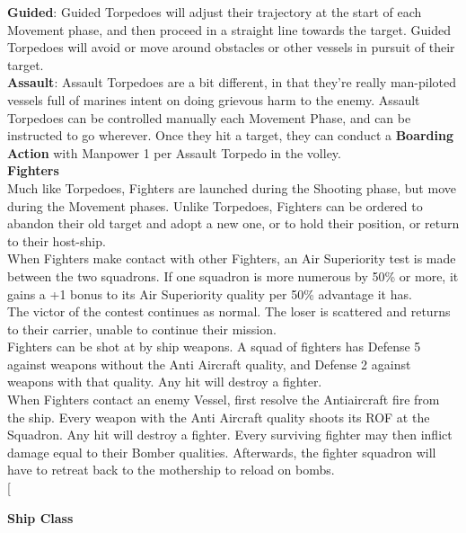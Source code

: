 \documentclass[a4paper, twocolumn, openany]{book}
\begin{document}
{{\bfseries Guided}: Guided Torpedoes will adjust their trajectory at the start of each Movement phase, and
then proceed in a straight line towards the target. Guided Torpedoes will avoid or move around
obstacles or other vessels in pursuit of their target.\\

{\bfseries Assault}: Assault Torpedoes are a bit different, in that they’re really man-piloted vessels full of
marines intent on doing grievous harm to the enemy. Assault Torpedoes can be controlled
manually each Movement Phase, and can be instructed to go wherever. Once they hit a target,
they can conduct a {\bfseries Boarding Action} with Manpower 1 per Assault Torpedo in the volley.\\

{\bfseries Fighters\\}
Much like Torpedoes, Fighters are launched during the Shooting phase, but move during the
Movement phases. Unlike Torpedoes, Fighters can be ordered to abandon their old target and
adopt a new one, or to hold their position, or return to their host-ship.\\

When Fighters make contact with other Fighters, an Air Superiority test is made between the
two squadrons. If one squadron is more numerous by 50\% or more, it gains a +1 bonus to its Air
Superiority quality per 50\% advantage it has.\\
The victor of the contest continues as normal. The loser is scattered and returns to their carrier,
unable to continue their mission.\\

Fighters can be shot at by ship weapons. A squad of fighters has Defense 5 against weapons
without the Anti Aircraft quality, and Defense 2 against weapons with that quality. Any hit will
destroy a fighter.\\

When Fighters contact an enemy Vessel, first resolve the Antiaircraft fire from the ship. Every
weapon with the Anti Aircraft quality shoots its ROF at the Squadron. Any hit will destroy a
fighter. Every surviving fighter may then inflict damage equal to their Bomber qualities.
Afterwards, the fighter squadron will have to retreat back to the mothership to reload on bombs.\\

\twocolumn[{
	\setlength{\parindent}{10.00002pt}

	{\bfseries Ship Class\\}

}}
\end{document}
